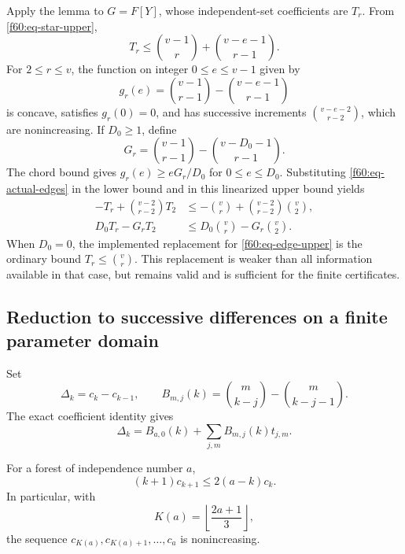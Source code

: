 Apply the lemma to $G=F[Y]$, whose independent-set coefficients are
$T_r$.  From \eqref{f60:eq-star-upper},
\begin{equation}
 T_r\le\binom{v-1}{r}+\binom{v-e-1}{r-1}.
 \label{f60:eq-edge-upper-raw}
\end{equation}
For $2\le r\le v$, the function on integer $0\le e\le v-1$ given by
\[
 g_r(e)=\binom{v-1}{r-1}-\binom{v-e-1}{r-1}
\]
is concave, satisfies $g_r(0)=0$, and has successive increments
$\binom{v-e-2}{r-2}$, which are nonincreasing.  If $D_0\ge1$, define
\begin{equation}
 G_r=\binom{v-1}{r-1}-\binom{v-D_0-1}{r-1}.
 \label{f60:eq-G}
\end{equation}
The chord bound gives $g_r(e)\ge eG_r/D_0$ for $0\le e\le D_0$.
Substituting \eqref{f60:eq-actual-edges} in the lower bound and in this
linearized upper bound yields
\begin{align}
 -T_r+\binom{v-2}{r-2}T_2
 &\le-\binom vr+\binom{v-2}{r-2}\binom v2,
 \label{f60:eq-edge-lower}\\
 D_0T_r-G_rT_2
 &\le D_0\binom vr-G_r\binom v2.
 \label{f60:eq-edge-upper}
\end{align}
When $D_0=0$, the implemented replacement for
\eqref{f60:eq-edge-upper} is the ordinary bound $T_r\le\binom vr$.
This replacement is weaker than all information available in that
case, but remains valid and is sufficient for the finite certificates.

\subsection{Reduction to successive differences on a finite parameter domain}
\label{f60:subsec-differences}

Set
\begin{equation}
 \Delta_k=c_k-c_{k-1},\qquad
 B_{m,j}(k)=\binom m{k-j}-\binom m{k-j-1}.
 \label{f60:eq-difference-notation}
\end{equation}
The exact coefficient identity gives
\begin{equation}
 \Delta_k=B_{a,0}(k)+\sum_{j,m}B_{m,j}(k)t_{j,m}.
 \label{f60:eq-difference}
\end{equation}

\begin{lemma}
\label{f60:lem-tail-cutoff}
For a forest of independence number $a$,
\begin{equation}
 (k+1)c_{k+1}\le2(a-k)c_k.
 \label{f60:eq-tail-ratio}
\end{equation}
In particular, with
\begin{equation}
 K(a)=\left\lfloor\frac{2a+1}{3}\right\rfloor,
 \label{f60:eq-cutoff}
\end{equation}
the sequence $c_{K(a)},c_{K(a)+1},\ldots,c_a$ is nonincreasing.
\end{lemma}

